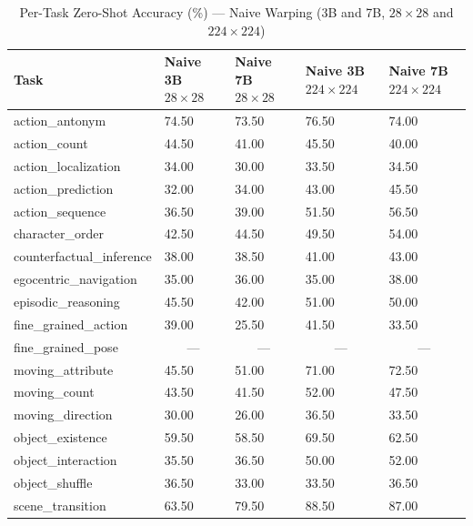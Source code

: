\documentclass[conference]{IEEEtran}
\begin{document}
\begin{table}[!t]
  \centering
  \def\arraystretch{1.2}
  \caption{Per-Task Zero-Shot Accuracy (\%) --- Naive Warping (3B and 7B, $28{\times}28$ and $224{\times}224$)}
  \label{tab:naive_acc}
  \begin{tabularx}{\textwidth}{>{\raggedright\arraybackslash}p{4.5cm} YYYY}
    \toprule
    \textbf{Task}
      & \textbf{Naive 3B $28{\times}28$}
      & \textbf{Naive 7B $28{\times}28$}
      & \textbf{Naive 3B $224{\times}224$}
      & \textbf{Naive 7B $224{\times}224$} \\
    \midrule
    action\_antonym            & 74.50 & 73.50 & 76.50 & 74.00 \\
    action\_count              & 44.50 & 41.00 & 45.50 & 40.00 \\
    action\_localization       & 34.00 & 30.00 & 33.50 & 34.50 \\
    action\_prediction         & 32.00 & 34.00 & 43.00 & 45.50 \\
    action\_sequence           & 36.50 & 39.00 & 51.50 & 56.50 \\
    \addlinespace
    character\_order           & 42.50 & 44.50 & 49.50 & 54.00 \\
    counterfactual\_inference  & 38.00 & 38.50 & 41.00 & 43.00 \\
    egocentric\_navigation     & 35.00 & 36.00 & 35.00 & 38.00 \\
    episodic\_reasoning        & 45.50 & 42.00 & 51.00 & 50.00 \\
    fine\_grained\_action      & 39.00 & 25.50 & 41.50 & 33.50 \\
    \addlinespace
    fine\_grained\_pose        &  &  &  &  \\
    moving\_attribute          & 45.50 & 51.00 & 71.00 & 72.50 \\
    moving\_count              & 43.50 & 41.50 & 52.00 & 47.50 \\
    moving\_direction          & 30.00 & 26.00 & 36.50 & 33.50 \\
    object\_existence          & 59.50 & 58.50 & 69.50 & 62.50 \\
    \addlinespace
    object\_interaction        & 35.50 & 36.50 & 50.00 & 52.00 \\
    object\_shuffle            & 36.50 & 33.00 & 33.50 & 36.50 \\
    scene\_transition          & 63.50 & 79.50 & 88.50 & 87.00 \\

\end{tabularx}
\end{table}
\end{document}
